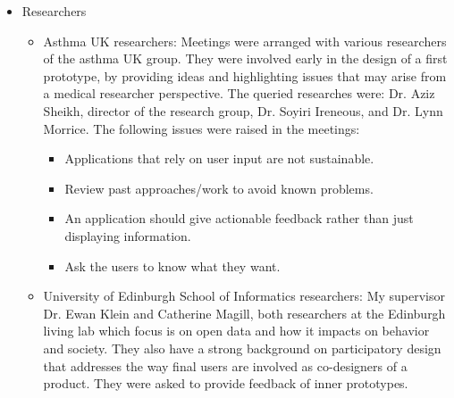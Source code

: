 \begin{itemize}



	\item Researchers 
    \begin{itemize}
      \item Asthma UK researchers: Meetings were arranged with various researchers of the asthma UK group. They were involved early in the design of a first prototype, by providing ideas and highlighting issues that may arise from a medical researcher perspective. The queried researches were:  Dr. Aziz Sheikh, director of the research group, Dr. Soyiri Ireneous, and Dr. Lynn Morrice.
    The following issues were raised in the meetings:
      \begin{itemize}
          \item Applications that rely on user input are not sustainable.
          \item Review past approaches/work to avoid known problems.
          \item An application should give actionable feedback rather than just displaying information.
          \item Ask the users to know what they want.
      \end{itemize}
      \item University of Edinburgh School of Informatics researchers: My supervisor Dr. Ewan Klein and Catherine Magill, both researchers at the Edinburgh living lab which focus is on open data and how it impacts on behavior and society. They also have a strong background on participatory design that addresses the way final users are involved as co-designers of a product. They were asked to provide feedback of inner prototypes.
	\end{itemize}
    

\end{itemize}
